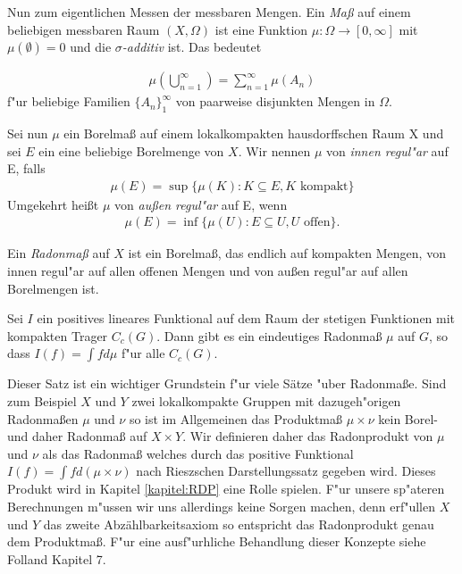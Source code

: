 	
	Nun zum eigentlichen Messen der messbaren Mengen. 
	Ein \emph{Maß} auf einem beliebigen messbaren Raum $(X, \Omega)$ ist eine Funktion $\mu: \Omega \to [0, \infty]$ mit $\mu(\emptyset) = 0$ und die \emph{$\sigma$-additiv} ist. 
	Das bedeutet
	
	\begin{align*}
		\mu( \bigcup_{n=1}^{\infty}) = \sum_{n=1}^{\infty} \mu (A_n)
	\end{align*}
	f"ur beliebige Familien $\{A_n\}_1^\infty$ von paarweise disjunkten Mengen in $\Omega$.
	
	
	Sei nun $\mu$ ein Borelmaß auf einem lokalkompakten hausdorffschen Raum X und sei $E$ ein eine beliebige Borelmenge von $X$.
	Wir nennen $\mu$ von \emph{innen regul"ar} auf E, falls
	\begin{align*}
		\mu(E) = \sup\{\mu(K): K \subseteq E, K \text{ kompakt}\}
	\end{align*}
	Umgekehrt heißt $\mu$ von \emph{außen regul"ar} auf E, wenn
	\begin{align*}
		\mu(E) = \inf\{\mu(U): E \subseteq U, U \text{ offen}\}.
	\end{align*}
	
	
	\begin{defi}
		Ein \emph{Radonmaß} auf $X$ ist ein Borelmaß, das endlich auf kompakten Mengen, von innen regul"ar auf allen offenen Mengen und von außen regul"ar auf allen Borelmengen ist.
	\end{defi}
	
	\begin{satz}
		Sei $I$ ein positives lineares Funktional auf dem Raum der stetigen Funktionen mit kompakten Trager $C_c(G)$. Dann gibt es ein eindeutiges Radonmaß $\mu$ auf $G$, so dass $I(f) = \int f d\mu$ f"ur alle $C_c(G)$.
	\end{satz}
	Dieser Satz ist ein wichtiger Grundstein f"ur viele Sätze "uber Radonmaße.
	Sind zum Beispiel $X$ und $Y$ zwei lokalkompakte Gruppen mit dazugeh"origen Radonmaßen $\mu$ und $\nu$ so ist im Allgemeinen das Produktmaß $\mu \times \nu$ kein Borel- und daher Radonmaß auf $X \times Y$.
	Wir definieren daher das Radonprodukt von $\mu$ und $\nu$ als das Radonmaß welches durch das positive Funktional $I(f) = \int f d(\mu \times \nu)$ nach Rieszschen Darstellungssatz gegeben wird.
	Dieses Produkt wird in Kapitel \ref{kapitel:RDP} eine Rolle spielen. F"ur unsere sp"ateren Berechnungen m"ussen wir uns allerdings keine Sorgen machen, denn erf"ullen $X$ und $Y$ das zweite Abzählbarkeitsaxiom so entspricht das Radonprodukt genau dem Produktmaß. F"ur eine ausf"urhliche Behandlung dieser Konzepte siehe Folland \cite{folland} Kapitel 7.
	
